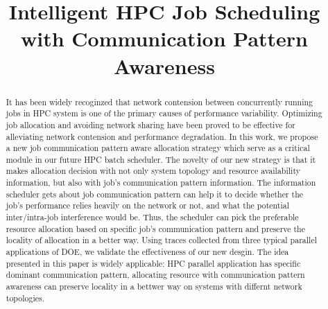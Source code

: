 \documentclass[conference]{IEEEtran}
\begin{document}
%
\title{Intelligent HPC Job Scheduling with Communication Pattern Awareness}
\author{



}

\maketitle

\begin{abstract} 

It has been widely recoginzed that network contension between concurrently running jobs in HPC system is one of the primary causes of performance variability. Optimizing job allocation and avoiding network sharing have been proved to be effective for alleviating network contension and performance degradation. In this work, we propose a new job communication pattern aware allocation strategy which serve as a critical module in our future HPC batch scheduler. The novelty of our new strategy is that it makes allocation decision with not only system topology and resource availability information, but also with job's communication pattern information. The information scheduler gets about job communication pattern can help it to decide whether the job’s performance relies heavily on the network or not, and what the potential inter/intra-job interference would be. Thus, the scheduler can pick the preferable resource allocation based on specific job's communication pattern and preserve the locality of allocation in a better way. Using traces collected from three typical parallel applications of DOE, we validate the effectiveness of our new desgin. The idea presented in this paper is widely applicable: HPC parallel application has specific dominant communication pattern, allocating resource with communication pattern awareness can preserve locality in a bettwer way on systems with differnt network topologies.

\end{abstract}
\end{document}
